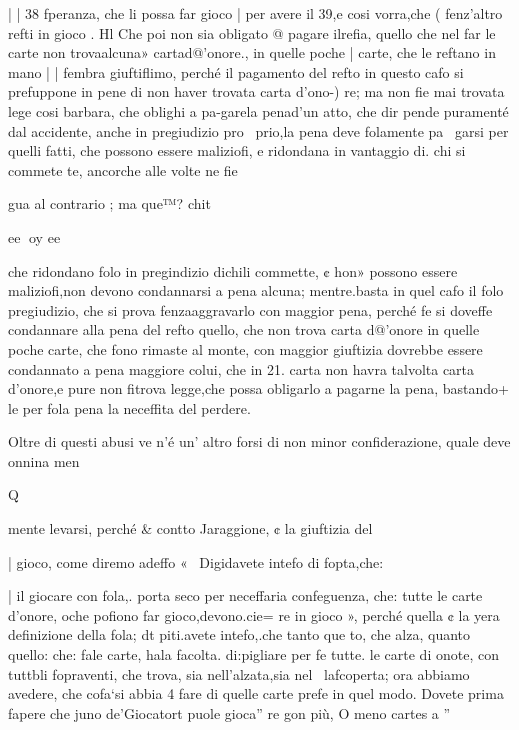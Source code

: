\documentclass[12pt,a6paper]{article}
\begin{document}
 

 

 
 

| | 38
 fperanza, che li possa far gioco
| per avere il 39,e cosi vorra,che
( fenz’altro refti in gioco .
Hl Che poi non sia obligato @
pagare ilrefia, quello che nel
far le carte non trovaalcuna»
cartad@’onore., in quelle poche
| carte, che le reftano in mano
| | fembra giuftiflimo, perché il
pagamento del refto in questo
cafo si prefuppone in pene di
non haver trovata carta d’ono-)
re; ma non fie mai trovata lege
cosi barbara, che oblighi a pa-garela penad'un atto, che dir
pende puramenté dal accidente, anche in pregiudizio pro~
prio,la pena deve folamente pa~
garsi per quelli fatti, che possono essere maliziofi, e ridondana
in vantaggio di. chi si commete
te, ancorche alle volte ne fie

gua al contrario ; ma que™?
chit

 

 

 

 

ee
oy ee

che ridondano folo in pregindizio dichili commette, ¢ hon»
possono essere maliziofi,non devono condannarsi a pena alcuna; mentre.basta in quel cafo il
folo pregiudizio, che si prova
fenzaaggravarlo con maggior
pena, perché fe si doveffe condannare alla pena del refto quello, che non trova carta d@’onore
in quelle poche carte, che fono
rimaste al monte, con maggior
giuftizia dovrebbe essere condannato a pena maggiore colui,
che in 21. carta non havra talvolta carta d’onore,e pure non
fitrova legge,che possa obligarlo a pagarne la pena, bastando+
le per fola pena la neceffita del
perdere.

Oltre di questi abusi ve n’é un’
altro forsi di non minor confiderazione, quale deve onnina
men
 

 

 
 

Q

mente levarsi, perché & contto
Jaraggione, ¢ la giuftizia del

| gioco, come diremo adeffo «
  ~Digidavete intefo di fopta,che:

| il giocare con fola,. porta seco
per neceffaria confeguenza, che:
tutte le carte d’onore, oche
pofiono far gioco,devono.cie=
re in gioco », perché quella ¢ la
yera definizione della fola; dt
piti.avete intefo,.che tanto que
to, che alza, quanto quello: che:
fale carte, hala facolta. di:pigliare per fe tutte. le carte di
onote, con tuttbli fopraventi,
che trova, sia nell’alzata,sia nel~
lafcoperta; ora abbiamo avedere, che cofa‘si abbia 4 fare di
quelle carte prefe in quel modo.
Dovete prima fapere che
juno de’Giocatort puole gioca”
re gon più, O meno cartes a ”
\end{document}
